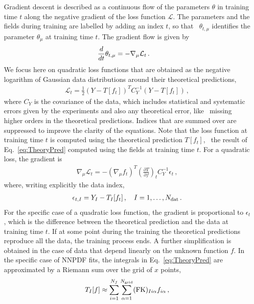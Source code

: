 Gradient descent is described as a continuous flow of the parameters $\theta$ in
training time $t$ along the negative gradient of the loss function
$\mathcal{L}$. The parameters and the fields during training are labelled by
adding an index $t$, so that \eg\ $\theta_{t,\mu}$ identifies the parameter
$\theta_\mu$ at training time $t$. The gradient flow is given by
\begin{align}
    \label{eq:GradientFlowDef}
    \frac{d}{dt} &\theta_{t,\mu} = -\nabla_\mu \mathcal{L}_t\, .
\end{align}
We focus here on quadratic loss functions that are obtained as the negative
logarithm of Gaussian data distributions around their theoretical predictions,
\begin{align}
    \label{eq:QuadLoss}
    \mathcal{L}_t = \frac12 \left(Y - T[f_t]\right)^T C_Y^{-1} \left(Y - T[f_t]\right)\, ,
\end{align}
where $C_Y$ is the covariance of the data, which includes statistical and
systematic errors given by the experiments and also any theoretical error, like
\eg\ missing higher orders in the theoretical predictions. Indices that are
summed over are suppressed to improve the clarity of the equations. Note that
the loss function at training time $t$ is computed using the theoretical
prediction $T[f_t]$, \ie\ the result of Eq.~\eqref{eq:TheoryPred} computed using
the fields at training time $t$. For a quadratic loss, the gradient is
\begin{align}
    \nabla_\mu \mathcal{L}_t = - \left(\nabla_\mu f_t\right)^T \left(\frac{\partial T}{\partial f}\right)_t
      C_Y^{-1} \epsilon_t\, ,
\end{align}
where, writing explicitly the data index,
\begin{align}
    \label{eq:EpsDef}
    \epsilon_{t,I} = Y_I - T_I[f_t]\, , \quad I=1, \ldots, N_{\mathrm{dat}}\, .
\end{align}
For the specific case of a quadratic loss function, the gradient is proportional
to $\epsilon_t$, which is the difference between the theoretical prediction and
the data at training time $t$. If at some point during the training the
theoretical predictions reproduce all the data, the training process ends. A
further simplification is obtained in the case of data that depend linearly on
the unknown function $f$. In the specific case of NNPDF fits, the integrals in
Eq.~\eqref{eq:TheoryPred} are approximated by a Riemann sum over the grid of $x$
points,
\begin{align}
    \label{eq:FKTabDef}
    T_I[f] \approx \sum_{i=1}^{N_{f}}\sum_{\alpha=1}^{N_{\mathrm{grid}}} (\mathrm{FK})_{Ii\alpha} f_{i\alpha}\, ,
\end{align}
